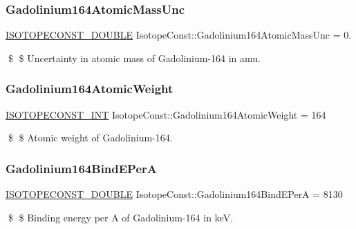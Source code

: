 \subsubsection{\texorpdfstring{Gadolinium164\+Atomic\+Mass\+Unc}{Gadolinium164AtomicMassUnc}}
{\footnotesize\ttfamily \mbox{\hyperlink{group___isotope_const-_macros_ga8f45a7272ce02c0b4c65c44636ed719a}{I\+S\+O\+T\+O\+P\+E\+C\+O\+N\+S\+T\+\_\+\+D\+O\+U\+B\+LE}} Isotope\+Const\+::\+Gadolinium164\+Atomic\+Mass\+Unc = 0.}

\$ \$ Uncertainty in atomic mass of Gadolinium-\/164 in amu. \mbox{\label{group___isotope_const-_gadolinium-_gd164_gaad37dcafb584edacff11c0dcb8f560c4}} 
\subsubsection{\texorpdfstring{Gadolinium164\+Atomic\+Weight}{Gadolinium164AtomicWeight}}
{\footnotesize\ttfamily \mbox{\hyperlink{group___isotope_const-_macros_ga5f18360b3e99483a35c32d789e62621c}{I\+S\+O\+T\+O\+P\+E\+C\+O\+N\+S\+T\+\_\+\+I\+NT}} Isotope\+Const\+::\+Gadolinium164\+Atomic\+Weight = 164}

\$ \$ Atomic weight of Gadolinium-\/164. \mbox{\label{group___isotope_const-_gadolinium-_gd164_gaa3f93172037ecab71f9e17b75f0c0ed5}} 
\subsubsection{\texorpdfstring{Gadolinium164\+Bind\+E\+PerA}{Gadolinium164BindEPerA}}
{\footnotesize\ttfamily \mbox{\hyperlink{group___isotope_const-_macros_ga8f45a7272ce02c0b4c65c44636ed719a}{I\+S\+O\+T\+O\+P\+E\+C\+O\+N\+S\+T\+\_\+\+D\+O\+U\+B\+LE}} Isotope\+Const\+::\+Gadolinium164\+Bind\+E\+PerA = 8130}

\$ \$ Binding energy per A of Gadolinium-\/164 in keV. \mbox{\label{group___isotope_const-_gadolinium-_gd164_ga633c54abafc215e78e2a8c31bb763d20}} 
